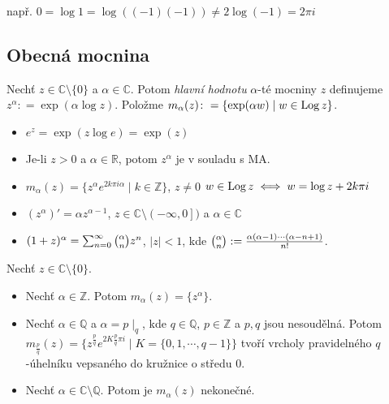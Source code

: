 
např. $0=\log 1= \log((-1)(-1))\neq 2 \log(-1)=2\pi i$

\subsection{Obecná mocnina}

\begin{definition}
Nechť $z \in\mathbb{C}\setminus\{0\}$ a  $\alpha\in\mathbb{C}$. Potom \emph{hlavní hodnotu} $\alpha$-té mocniny $z$ definujeme $z^{\alpha}\colon=\exp(\alpha \log z)$. Položme $m_{\alpha}(z)\colon=\{\exp(\alpha w)\mid w\in \operatorname*{Log} z\}$. 
\end{definition}

\begin{properties}
\mbox{}
\vspace{-2em}
\begin{itemize}
    \item $e^z=\exp(z \log e)=\exp(z)$ 
    \item Je-li $z>0$ a $\alpha\in\mathbb{R}$, potom $z^{\alpha}$ je v souladu s MA.
    \item $m_{\alpha}(z)=\{z^{\alpha}e^{2k\pi i \alpha}\mid k\in\mathbb{Z}\}$, $z\neq 0$
    \newline
    $w\in \operatorname*{Log} z\iff w=\log z +2k\pi i$
    \item $(z^{\alpha})'=\alpha z^{\alpha-1}$, $z\in\mathbb{C}\setminus\left (-\infty,0\right ])$ a $\alpha\in\mathbb{C}$
    \item $(1+z)^{\alpha}=\sum_{n=0}^{\infty}\tbinom{\alpha}{n}z^{n} $, $\lvert z \rvert<1$, kde $\tbinom{\alpha}{n}:=\frac{\alpha(\alpha-1)\cdots(\alpha-n+1)}{n!}$.
\end{itemize}
\end{properties}

\begin{example}
Nechť $z \in\mathbb{C}\setminus\{0\}$.
\begin{itemize}
    \item Nechť $\alpha\in\mathbb{Z}$. Potom $m_{\alpha}(z)=\{z^{\alpha}\}$.
    \item Nechť $\alpha\in\mathbb{Q}$ a $\alpha=p\mid_q$, kde $q\in\mathbb{Q}$, $p\in\mathbb{Z}$ a $p,q$ jsou nesoudělná. Potom $m_{\frac{p}{q}}(z)=\{z^{\frac{p}{q}}e^{2K\frac{p}{q}\pi i}\mid K=\{0,1,\cdots,q-1\}\}$
    tvoří vrcholy pravidelného $q$-úhelníku vepsaného do kružnice o středu $0$.
    \item Nechť $\alpha\in\mathbb{C}\setminus\mathbb{Q}$. Potom je $m_{\alpha}(z)$ nekonečné.
\end{itemize}
\end{example}

